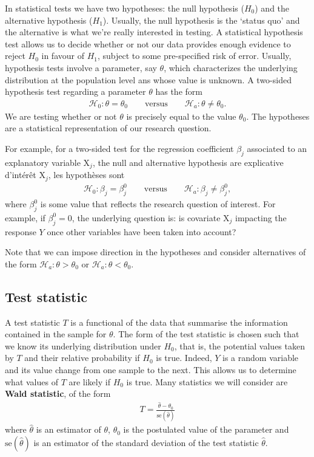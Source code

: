\documentclass[
  11pt,
  letterpaper,
]{book}
\theoremstyle{definition}
\theoremstyle{definition}
\theoremstyle{definition}
\theoremstyle{remark}
\begin{document}
In statistical tests we have two hypotheses: the null hypothesis (\(H_0\)) and the alternative hypothesis (\(H_1\)). Usually, the null hypothesis is the `status quo' and the alternative is what we're really interested in testing. A statistical hypothesis test allows us to decide whether or not our data provides enough evidence to reject \(H_0\) in favour of \(H_1\), subject to some pre-specified risk of error. Usually, hypothesis tests involve a parameter, say \(\theta\), which characterizes the underlying distribution at the population level ans whose value is unknown. A two-sided hypothesis test regarding a parameter \(\theta\) has the form
\begin{align*}
\mathscr{H}_0: \theta=\theta_0 \qquad \text{versus} \qquad \mathscr{H}_a:\theta \neq \theta_0.
\end{align*}
We are testing whether or not \(\theta\) is precisely equal to the value \(\theta_0\). The hypotheses are a statistical representation of our research question.

For example, for a two-sided test for the regression coefficient \(\beta_j\) associated to an explanatory variable \(\mathrm{X}_j\), the null and alternative hypothesis are
explicative d'intérêt \(\mathrm{X}_j\), les hypothèses sont
\begin{align*}
\mathscr{H}_0: \beta_j=\beta_j^0 \qquad \text{versus} \qquad \mathscr{H}_a:\beta_j \neq \beta_j^0, 
\end{align*}
where \(\beta_j^0\) is some value that reflects the research question of interest. For example, if \(\beta_j^0=0\), the underlying question is: is covariate \(\mathrm{X}_j\) impacting the response \(Y\) once other variables have been taken into account?

Note that we can impose direction in the hypotheses and consider alternatives of the form \(\mathscr{H}_a: \theta > \theta_0\) or \(\mathscr{H}_a: \theta < \theta_0\).

\hypertarget{test-statistic}{%
\subsection{Test statistic}\label{test-statistic}}

A test statistic \(T\) is a functional of the data that summarise the information contained in the sample for \(\theta\). The form of the test statistic is chosen such that we know its underlying distribution under \(H_0\), that is, the potential values taken by \(T\) and their relative probability if \(H_0\) is true. Indeed, \(Y\) is a random variable and its value change from one sample to the next.
This allows us to determine what values of \(T\) are likely if \(H_0\) is true. Many statistics we will consider are \textbf{Wald statistic}, of the form
\begin{align*}
T = \frac{\widehat{\theta} - \theta_0}{\mathrm{se}(\widehat{\theta})} 
\end{align*}
where \(\widehat{\theta}\) is an estimator of \(\theta\), \(\theta_0\) is the postulated value of the parameter and \(\mathrm{se}(\widehat{\theta})\) is an estimator of the standard deviation of the test statistic \(\widehat{\theta}\).
\end{document}
